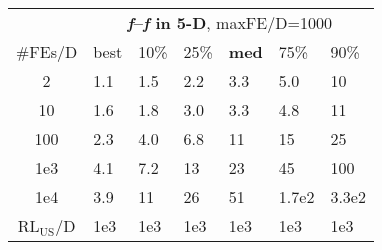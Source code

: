 \begin{tabular}{c|llllll}
 & \multicolumn{6}{|c}{\textbf{\textit{f}\raisebox{-0.35ex}{1}--\textit{f}\raisebox{-0.35ex}{24} in 5-D}, maxFE/D=1000}\\
\#FEs/D & best & 10\% & 25\% & \textbf{med} & 75\% & 90\%\\
2 & \hspace*{1ex}1.1 & \hspace*{1ex}1.5 & \hspace*{1ex}2.2 & \hspace*{1ex}3.3 & \hspace*{1ex}5.0 & 10\\
10 & \hspace*{1ex}1.6 & \hspace*{1ex}1.8 & \hspace*{1ex}3.0 & \hspace*{1ex}3.3 & \hspace*{1ex}4.8 & 11\\
100 & \hspace*{1ex}2.3 & \hspace*{1ex}4.0 & \hspace*{1ex}6.8 & 11 & 15 & 25\\
1e3 & \hspace*{1ex}4.1 & \hspace*{1ex}7.2 & 13 & 23 & 45 & 100\\
1e4 & \hspace*{1ex}3.9 & 11 & 26 & 51 & 1.7e2 & 3.3e2\\
$\text{RL}_{\text{US}}$/D & 1e3 & 1e3 & 1e3 & 1e3 & 1e3 & 1e3
\end{tabular}
